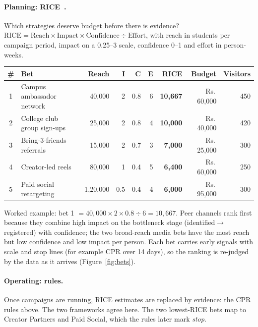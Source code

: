 \documentclass[11pt,a4paper]{article}
\newcommand{\rs}{Rs.\,}
\begin{document}
\paragraph{Planning: RICE~\cite{intercomRice}.} Which strategies deserve budget before there is evidence? $\text{RICE} = \text{Reach} \times \text{Impact} \times \text{Confidence} \div \text{Effort}$, with reach in students per campaign period, impact on a 0.25--3 scale, confidence 0--1 and effort in person-weeks.

\begin{center}\small
\begin{tabular}{@{}clrrrrrrr@{}}
\toprule
\textbf{\#} & \textbf{Bet} & \textbf{Reach} & \textbf{I} & \textbf{C} & \textbf{E} & \textbf{RICE} & \textbf{Budget} & \textbf{Visitors} \\
\midrule
1 & Campus ambassador network & 40,000 & 2 & 0.8 & 6 & \textbf{10,667} & \rs60,000 & 450 \\
2 & College club group sign-ups & 25,000 & 2 & 0.8 & 4 & \textbf{10,000} & \rs40,000 & 420 \\
3 & Bring-3-friends referrals & 15,000 & 2 & 0.7 & 3 & \textbf{7,000} & \rs25,000 & 300 \\
4 & Creator-led reels & 80,000 & 1 & 0.4 & 5 & \textbf{6,400} & \rs60,000 & 250 \\
5 & Paid social retargeting & 1,20,000 & 0.5 & 0.4 & 4 & \textbf{6,000} & \rs95,000 & 300 \\
\bottomrule
\end{tabular}
\end{center}
Worked example: bet 1 $= 40{,}000 \times 2 \times 0.8 \div 6 = 10{,}667$. Peer channels rank first because they combine high impact on the bottleneck stage (identified$\to$registered) with confidence; the two broad-reach media bets have the most reach but low confidence and low impact per person. Each bet carries early signals with scale and stop lines (for example CPR over 14 days), so the ranking is re-judged by the data as it arrives (Figure~\ref{fig:bets}).

\paragraph{Operating: rules.} Once campaigns are running, RICE estimates are replaced by evidence: the CPR rules above. The two frameworks agree here. The two lowest-RICE bets map to Creator Partners and Paid Social, which the rules later mark \emph{stop}.
\end{document}
